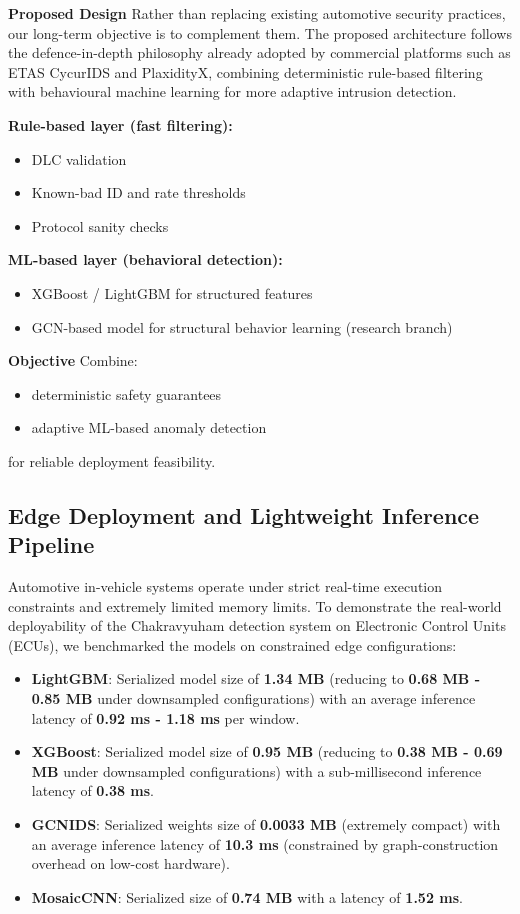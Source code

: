 \documentclass{article}
\begin{document}
\textbf{Proposed Design}
Rather than replacing existing automotive security practices, our long-term objective is to complement them. The proposed architecture follows the defence-in-depth philosophy already adopted by commercial platforms such as ETAS CycurIDS and PlaxidityX, combining deterministic rule-based filtering with behavioural machine learning for more adaptive intrusion detection.

\textbf{Rule-based layer (fast filtering):}
\begin{itemize}[noitemsep]
    \item DLC validation
    \item Known-bad ID and rate thresholds
    \item Protocol sanity checks
\end{itemize}

\textbf{ML-based layer (behavioral detection):}
\begin{itemize}[noitemsep]
    \item XGBoost / LightGBM for structured features
    \item GCN-based model for structural behavior learning (research branch)
\end{itemize}

\textbf{Objective}
Combine:
\begin{itemize}[noitemsep]
    \item deterministic safety guarantees
    \item adaptive ML-based anomaly detection
\end{itemize}
for reliable deployment feasibility.

\subsection{Edge Deployment and Lightweight Inference Pipeline}
Automotive in-vehicle systems operate under strict real-time execution constraints and extremely limited memory limits. To demonstrate the real-world deployability of the Chakravyuham detection system on Electronic Control Units (ECUs), we benchmarked the models on constrained edge configurations:
\begin{itemize}[noitemsep]
    \item \textbf{LightGBM}: Serialized model size of \textbf{1.34 MB} (reducing to \textbf{0.68 MB - 0.85 MB} under downsampled configurations) with an average inference latency of \textbf{0.92 ms - 1.18 ms} per window.
    \item \textbf{XGBoost}: Serialized model size of \textbf{0.95 MB} (reducing to \textbf{0.38 MB - 0.69 MB} under downsampled configurations) with a sub-millisecond inference latency of \textbf{0.38 ms}.
    \item \textbf{GCNIDS}: Serialized weights size of \textbf{0.0033 MB} (extremely compact) with an average inference latency of \textbf{10.3 ms} (constrained by graph-construction overhead on low-cost hardware).
    \item \textbf{MosaicCNN}: Serialized size of \textbf{0.74 MB} with a latency of \textbf{1.52 ms}.
\end{itemize}
\end{document}
